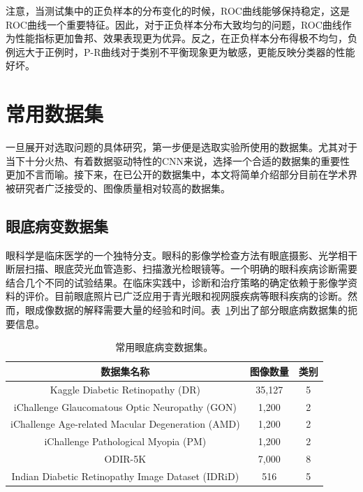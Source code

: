 注意，当测试集中的正负样本的分布变化的时候，ROC曲线能够保持稳定，这是ROC曲线一个重要特征。因此，对于正负样本分布大致均匀的问题，ROC曲线作为性能指标更加鲁邦、效果表现更为优异。反之，在正负样本分布得极不均匀，负例远大于正例时，P-R曲线对于类别不平衡现象更为敏感，更能反映分类器的性能好坏。

\section{常用数据集}\label{sec:usually_ds_intro}
一旦展开对选取问题的具体研究，第一步便是选取实验所使用的数据集。尤其对于当下十分火热、有着数据驱动特性的CNN来说，选择一个合适的数据集的重要性更加不言而喻。接下来，在已公开的数据集中，本文将简单介绍部分目前在学术界被研究者广泛接受的、图像质量相对较高的数据集。

\subsection{眼底病变数据集}\label{subsec:original_dr_dataset_intro}
眼科学是临床医学的一个独特分支。眼科的影像学检查方法有眼底摄影、光学相干断层扫描、眼底荧光血管造影、扫描激光检眼镜等。一个明确的眼科疾病诊断需要结合几个不同的试验结果。在临床实践中，诊断和治疗策略的确定依赖于影像学资料的评价。目前眼底照片已广泛应用于青光眼和视网膜疾病等眼科疾病的诊断。然而，眼成像数据的解释需要大量的经验和时间。表~\ref{tab:datasets_info}列出了部分眼底病数据集的扼要信息。
\begin{table}[h]
	\centering
	\caption{常用眼底病变数据集。}
	\label{tab:datasets_info}
	\begin{tabular}{c|c|c}
		\toprule[2pt]
		数据集名称 & 图像数量 & 类别 \\
		\midrule[2pt]
		Kaggle Diabetic Retinopathy (DR)	& 35,127	& 5	 \\
		\hline                         
		iChallenge Glaucomatous Optic Neuropathy (GON)    & 1,200    & 2 \\ \hline
		iChallenge Age-related Macular Degeneration (AMD) & 1,200    & 2  \\ \hline
		iChallenge Pathological Myopia (PM)               & 1,200    & 2 \\ \hline
		ODIR-5K & 7,000 & 8 \\ \hline
		
		Indian Diabetic Retinopathy Image Dataset (IDRiD) & 516 & 5  \\
		\bottomrule[2pt]
	\end{tabular}
\end{table}

